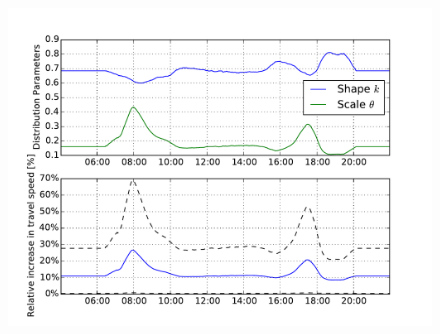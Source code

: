 \begin{figure}
    \centering
    \includegraphics[width=1.0\textwidth]{figures/randommodel.pdf}
    \caption{}
    \label{fig:randommodel}
\end{figure}

